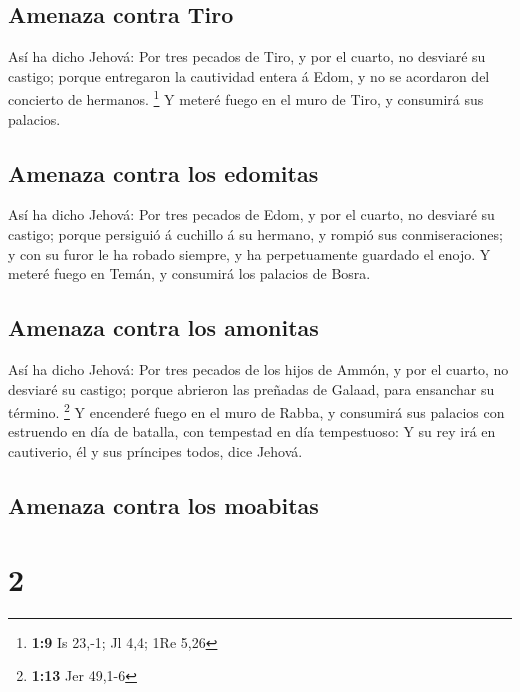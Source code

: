 \hypertarget{amenaza-contra-tiro}{%
\subsection{Amenaza contra Tiro}\label{amenaza-contra-tiro}}

 Así ha dicho Jehová: Por tres pecados de Tiro, y por el
cuarto, no desviaré su castigo; porque entregaron la cautividad entera á
Edom, y no se acordaron del concierto de hermanos. \footnote{\textbf{1:9}
  Is 23,-1; Jl 4,4; 1Re 5,26}  Y meteré fuego en el muro
de Tiro, y consumirá sus palacios.

\hypertarget{amenaza-contra-los-edomitas}{%
\subsection{Amenaza contra los
edomitas}\label{amenaza-contra-los-edomitas}}

 Así ha dicho Jehová: Por tres pecados de Edom, y por el
cuarto, no desviaré su castigo; porque persiguió á cuchillo á su
hermano, y rompió sus conmiseraciones; y con su furor le ha robado
siempre, y ha perpetuamente guardado el enojo.  Y meteré
fuego en Temán, y consumirá los palacios de Bosra.

\hypertarget{amenaza-contra-los-amonitas}{%
\subsection{Amenaza contra los
amonitas}\label{amenaza-contra-los-amonitas}}

 Así ha dicho Jehová: Por tres pecados de los hijos de
Ammón, y por el cuarto, no desviaré su castigo; porque abrieron las
preñadas de Galaad, para ensanchar su término. \footnote{\textbf{1:13}
  Jer 49,1-6}  Y encenderé fuego en el muro de Rabba, y
consumirá sus palacios con estruendo en día de batalla, con tempestad en
día tempestuoso:  Y su rey irá en cautiverio, él y sus
príncipes todos, dice Jehová.

\hypertarget{amenaza-contra-los-moabitas}{%
\subsection{Amenaza contra los
moabitas}\label{amenaza-contra-los-moabitas}}

\hypertarget{section-1}{%
\section{2}\label{section-1}}

